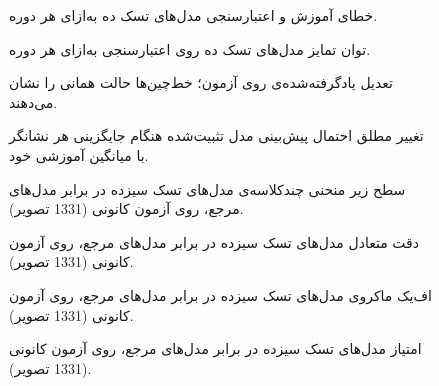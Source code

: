 \begin{figure}[htbp]
  \centering
  \caption{خطای آموزش و اعتبارسنجی مدل‌های تسک ده به‌ازای هر دوره.}
  \label{fig:U8}
\end{figure}

\begin{figure}[htbp]
  \centering
  \caption{توان تمایز مدل‌های تسک ده روی اعتبارسنجی به‌ازای هر دوره.}
  \label{fig:U9}
\end{figure}

\begin{figure}[htbp]
  \centering
  \caption{تعدیل یادگرفته‌شده‌ی  روی آزمون؛ خط‌چین‌ها حالت همانی را نشان می‌دهند.}
  \label{fig:U10}
\end{figure}

\begin{figure}[htbp]
  \centering
  \caption{تغییر مطلق احتمال پیش‌بینی مدل تثبیت‌شده هنگام جایگزینی هر نشانگر با میانگین آموزشی خود.}
  \label{fig:U11}
\end{figure}

\begin{figure}[htbp]
  \centering
  \caption{سطح زیر منحنی چندکلاسه‌ی مدل‌های تسک سیزده در برابر مدل‌های مرجع، روی آزمون کانونی (1331 تصویر).}
  \label{fig:U12}
\end{figure}

\begin{figure}[htbp]
  \centering
  \caption{دقت متعادل مدل‌های تسک سیزده در برابر مدل‌های مرجع، روی آزمون کانونی (1331 تصویر).}
  \label{fig:U13}
\end{figure}

\begin{figure}[htbp]
  \centering
  \caption{اف‌یک ماکروی مدل‌های تسک سیزده در برابر مدل‌های مرجع، روی آزمون کانونی (1331 تصویر).}
  \label{fig:U14}
\end{figure}

\begin{figure}[htbp]
  \centering
  \caption{امتیاز  مدل‌های تسک سیزده در برابر مدل‌های مرجع، روی آزمون کانونی (1331 تصویر).}
  \label{fig:U15}
\end{figure}

